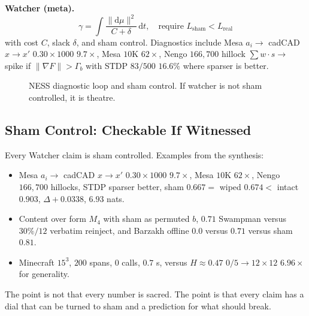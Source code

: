 \documentclass[11pt,a4paper]{article}
\begin{document}
\textbf{Watcher (meta).}
\begin{equation}
\gamma = \int \frac{\|\mathrm{d}\mu\|^2}{C+\delta}\,\mathrm{d}t,\quad \text{require } L_{\text{sham}} < L_{\text{real}}
\end{equation}
with cost $C$, slack $\delta$, and sham control. Diagnostics include Mesa $a_i\to$ cadCAD $x\to x'$ $0.30\times1000$ $9.7\times$, Mesa $10$K $62\times$, Nengo $166{,}700$ hillock $\sum w\cdot s \to$ spike if $\|\nabla F\| > \Gamma_b$ with STDP $83/500$ $16.6\%$ where sparser is better.

\begin{figure}[h]
\centering
{}
\caption{NESS diagnostic loop and sham control. If watcher is not sham controlled, it is theatre.}
\label{fig:ness}
\end{figure}

\subsection{Sham Control: Checkable If Witnessed}

Every Watcher claim is sham controlled. Examples from the synthesis:

\begin{itemize}[leftmargin=1.5em]
\item Mesa $a_i \to$ cadCAD $x\to x'$ $0.30\times1000$ $9.7\times$, Mesa $10$K $62\times$, Nengo $166{,}700$ hillocks, STDP sparser better, sham $0.667 = $ wiped $0.674 < $ intact $0.903$, $\Delta +0.0338$, $6.93$ nats.
\item Content over form $M_4$ with sham as permuted $b$, $0.71$ Swampman versus $30\%/12$ verbatim reinject, and Barzakh offline $0.0$ versus $0.71$ versus sham $0.81$.
\item Minecraft $15^3$, $200$ spans, $0$ calls, $0.7$ s, versus $H \approx 0.47$ $0/5 \to 12 \times 12$ $6.96\times$ for generality.
\end{itemize}

The point is not that every number is sacred. The point is that every claim has a dial that can be turned to sham and a prediction for what should break.
\end{document}

